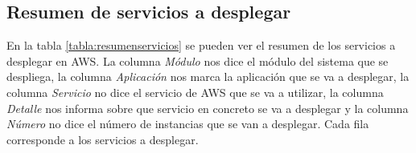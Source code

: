 \subsection{Resumen de servicios a desplegar}

\begin{table}[H]\label{tabla:resumenservicios}
	\centering
	\caption{Recursos de servicios a desplegar}
\end{table}

En la tabla \ref{tabla:resumenservicios} se pueden ver el resumen de los servicios a desplegar en AWS. La columna \textit{Módulo} nos dice el módulo del sistema que se despliega, la columna \textit{Aplicación} nos marca la aplicación que se va a desplegar, la columna \textit{Servicio} no dice el servicio de AWS que se va a utilizar, la columna \textit{Detalle} nos informa sobre que servicio en concreto se va a desplegar y la columna \textit{Número} no dice el número de instancias que se van a desplegar. Cada fila corresponde a los servicios a desplegar.

